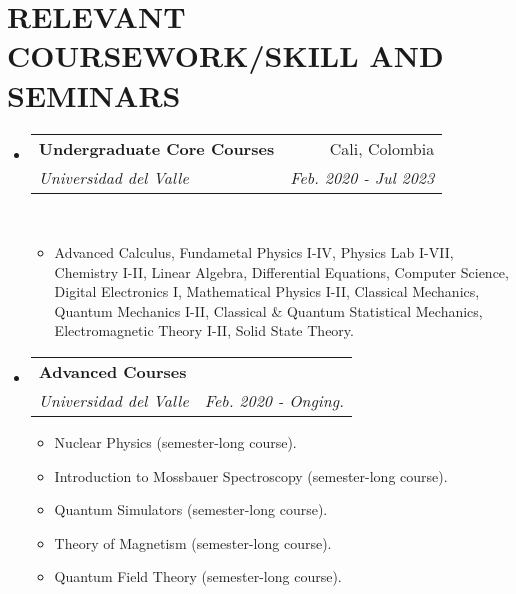 \documentclass[a4paper,20pt]{article}
\makeatletter
\newcommand{\resumeSubheading}[4]{
  \vspace{-1pt}\item
    \begin{tabular*}{0.97\textwidth}{l@{\extracolsep{\fill}}r}
      \textbf{#1} & #2 \\
      \textit{#3} & \textit{#4} \\
    \end{tabular*}\vspace{-5pt}
}
\newcommand{\resumeSubHeadingListStart}{\begin{itemize}[leftmargin=*]}
\newcommand{\resumeSubHeadingListEnd}{\end{itemize}}
\makeatother
\begin{document}
\vspace{-5pt}
\section{\textbf{RELEVANT COURSEWORK/SKILL AND SEMINARS}}

\resumeSubHeadingListStart
        \resumeSubheading
        {Undergraduate Core Courses }{\faMapMarker \hspace{1mm} Cali, Colombia}
        {Universidad del Valle }{Feb. 2020 - Jul 2023} \\ \vspace{2mm}
            \begin{itemize}[leftmargin=*]
                \item Advanced Calculus, Fundametal Physics I-IV, Physics Lab I-VII, Chemistry I-II, Linear Algebra, Differential Equations, Computer Science, Digital Electronics I, Mathematical Physics I-II, Classical Mechanics, Quantum Mechanics I-II, Classical \& Quantum Statistical Mechanics, Electromagnetic Theory I-II, Solid State Theory.
            \end{itemize}
\resumeSubHeadingListEnd
\vspace{-1mm}
\begin{minipage}{0.45\textwidth}
\resumeSubHeadingListStart
    \resumeSubheading{Advanced Courses}{} {Universidad del Valle }{Feb. 2020 - Onging.}
\begin{itemize}[leftmargin=*]
    \item {Nuclear Physics (semester-long course).}
\vspace{-5pt}
    \item {Introduction to Mossbauer Spectroscopy (semester-long course).}
\vspace{-5pt}
    \item {Quantum Simulators (semester-long course).}
\vspace{-5pt}
    \item {Theory of Magnetism (semester-long course).}
\vspace{-5pt}
    \item {Quantum Field Theory (semester-long course).}
    
\end{itemize}
\resumeSubHeadingListEnd
\end{minipage}
\quad \quad \textcolor{violet}{\vline} \quad
\end{document}
